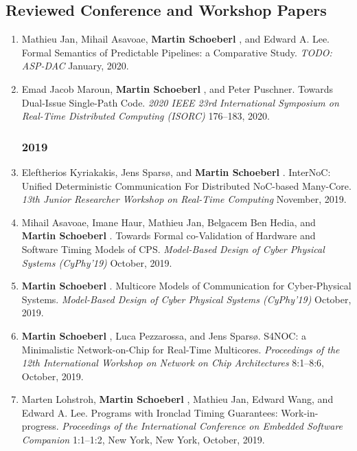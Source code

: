 \subsection*{Reviewed Conference and Workshop Papers}

\begin{enumerate}

\subsubsection*{2020}

\item Mathieu Jan, Mihail Asavoae, {\bf Martin Schoeberl }, and Edward A. Lee.
 Formal Semantics of Predictable Pipelines: a Comparative Study.
 \emph{TODO: ASP-DAC} January, 2020.

\item Emad Jacob Maroun, {\bf Martin Schoeberl }, and Peter Puschner.
 Towards Dual-Issue Single-Path Code.
 \emph{2020 IEEE 23rd International Symposium on Real-Time Distributed Computing (ISORC)} 176--183, 2020.


\subsubsection*{2019}

\item Eleftherios Kyriakakis, Jens Spars{\o}, and {\bf Martin Schoeberl }.
 InterNoC: Unified Deterministic Communication For Distributed NoC-based Many-Core.
 \emph{13th Junior Researcher Workshop on Real-Time Computing} November, 2019.

\item Mihail Asavoae, Imane Haur, Mathieu Jan, Belgacem Ben Hedia, and {\bf Martin Schoeberl }.
 Towards Formal co-Validation of Hardware and Software Timing Models of CPS.
 \emph{Model-Based Design of Cyber Physical Systems (CyPhy'19)} October, 2019.

\item {\bf Martin Schoeberl }.
 Multicore Models of Communication for Cyber-Physical Systems.
 \emph{Model-Based Design of Cyber Physical Systems (CyPhy'19)} October, 2019.

\item {\bf Martin Schoeberl }, Luca Pezzarossa, and Jens Spars{\o}.
 S4NOC: a Minimalistic Network-on-Chip for Real-Time Multicores.
 \emph{Proceedings of the 12th International Workshop on Network on Chip Architectures} 8:1--8:6, October, 2019.

\item Marten Lohstroh, {\bf Martin Schoeberl }, Mathieu Jan, Edward Wang, and Edward A. Lee.
 Programs with Ironclad Timing Guarantees: Work-in-progress.
 \emph{Proceedings of the International Conference on Embedded Software Companion} 1:1--1:2, New York, New York, October, 2019.


\end{enumerate}
